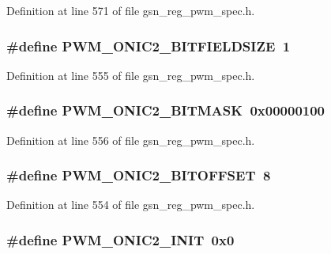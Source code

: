 Definition at line 571 of file gsn\_\-reg\_\-pwm\_\-spec.h.

\hypertarget{a00565_a9bfa96509dda21eff340370ccedd684b}{
\subsubsection[{PWM\_\-ONIC2\_\-BITFIELDSIZE}]{\setlength{\rightskip}{0pt plus 5cm}\#define PWM\_\-ONIC2\_\-BITFIELDSIZE~1}}
\label{a00565_a9bfa96509dda21eff340370ccedd684b}


Definition at line 555 of file gsn\_\-reg\_\-pwm\_\-spec.h.

\hypertarget{a00565_acc0b23fde7b18f435bdb338004f94edf}{
\subsubsection[{PWM\_\-ONIC2\_\-BITMASK}]{\setlength{\rightskip}{0pt plus 5cm}\#define PWM\_\-ONIC2\_\-BITMASK~0x00000100}}
\label{a00565_acc0b23fde7b18f435bdb338004f94edf}


Definition at line 556 of file gsn\_\-reg\_\-pwm\_\-spec.h.

\hypertarget{a00565_a47cf9ee8db1a0d2c45deaba2a05e36af}{
\subsubsection[{PWM\_\-ONIC2\_\-BITOFFSET}]{\setlength{\rightskip}{0pt plus 5cm}\#define PWM\_\-ONIC2\_\-BITOFFSET~8}}
\label{a00565_a47cf9ee8db1a0d2c45deaba2a05e36af}


Definition at line 554 of file gsn\_\-reg\_\-pwm\_\-spec.h.

\hypertarget{a00565_aaea40cf71b9841eaca0de14a491e1f60}{
\subsubsection[{PWM\_\-ONIC2\_\-INIT}]{\setlength{\rightskip}{0pt plus 5cm}\#define PWM\_\-ONIC2\_\-INIT~0x0}}
\label{a00565_aaea40cf71b9841eaca0de14a491e1f60}


